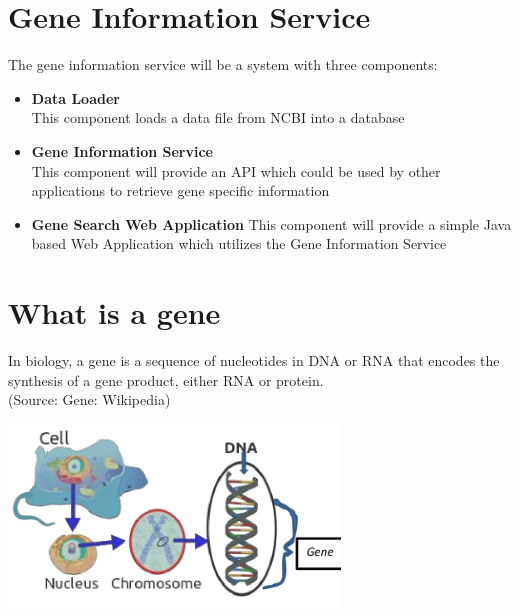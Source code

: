 

\section{Gene Information Service}
The gene information service will be a system with three components:

\begin{itemize}
\item \textbf{Data Loader}\\
This component loads a data file from NCBI into a database
\item \textbf{Gene Information Service}\\
This component will provide an API which could
be used by other applications to retrieve gene specific information
\item \textbf{Gene Search Web Application}
This component will provide a simple Java based Web Application
which utilizes the Gene Information Service
\end{itemize}

\section{What is a gene}
In biology, a gene is a sequence of nucleotides in DNA or RNA that encodes the
synthesis of a gene product, either RNA or protein.\\
(Source: Gene: Wikipedia)

\begin{centering}
\includegraphics[width=250pt]{images/coursework/geneinfo.jpg}\\
\end{centering}

